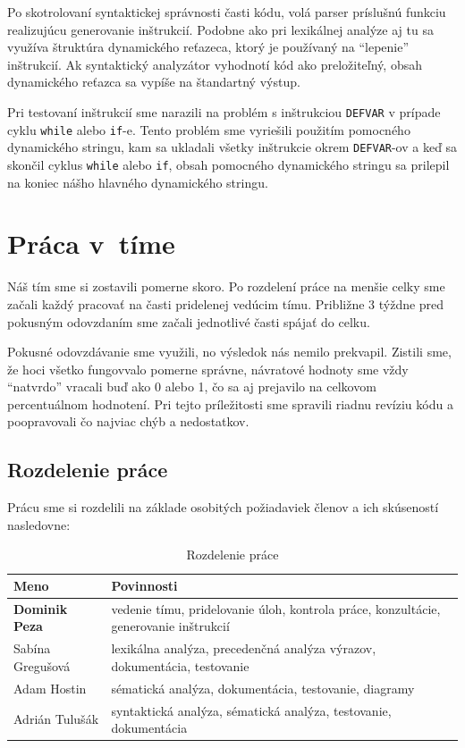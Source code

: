 \documentclass [11pt, a4paper]{article}
\begin{document}
Po skotrolovaní syntaktickej správnosti časti kódu, volá parser príslušnú funkciu realizujúcu generovanie inštrukcií. Podobne ako pri lexikálnej analýze aj tu sa využíva štruktúra dynamického reťazeca, ktorý je používaný na ``lepenie'' inštrukcií. Ak syntaktický analyzátor vyhodnotí kód ako preložiteľný, obsah dynamického reťazca sa vypíše na štandartný výstup.

Pri testovaní inštrukcií sme narazili na problém s inštrukciou \texttt{DEFVAR} v prípade cyklu \texttt{while} alebo \texttt{if}-e. Tento problém sme vyriešili použitím pomocného dynamického stringu, kam sa ukladali všetky inštrukcie okrem \texttt{DEFVAR}-ov a keď sa skončil cyklus \texttt{while} alebo \texttt{if}, obsah pomocného dynamického stringu sa prilepil na koniec nášho hlavného dynamického stringu.

\section{Práca v~tíme}
Náš tím sme si zostavili pomerne skoro. Po rozdelení práce na menšie celky sme začali každý pracovať na časti pridelenej vedúcim tímu. Približne 3 týždne pred pokusným odovzdaním sme začali jednotlivé časti spájať do celku. 

Pokusné odovzdávanie sme využili, no výsledok nás nemilo prekvapil. Zistili sme, že hoci všetko fungovvalo pomerne správne, návratové hodnoty sme vždy ``natvrdo'' vracali buď ako 0 alebo 1, čo sa aj prejavilo na celkovom percentuálnom hodnotení. Pri tejto príležitosti sme spravili riadnu revíziu kódu a poopravovali čo najviac chýb a nedostatkov.

\subsection{Rozdelenie práce}
Prácu sme si rozdelili na základe osobitých požiadaviek členov a ich skúseností nasledovne:
\begin{table}[H]
\centering
\begin{tabular}{|l|l|}
\hline
Meno & Povinnosti\\ \hline
\textbf{Dominik Peza} & vedenie tímu, pridelovanie úloh, kontrola práce, konzultácie, generovanie inštrukcií\\
Sabína Gregušová & lexikálna analýza, precedenčná analýza výrazov, dokumentácia, testovanie\\
Adam Hostin & sématická analýza, dokumentácia, testovanie, diagramy\\
Adrián Tulušák & syntaktická analýza, sématická analýza, testovanie, dokumentácia\\
\hline
\end{tabular}
\caption{Rozdelenie práce}
\end{table}
\end{document}
